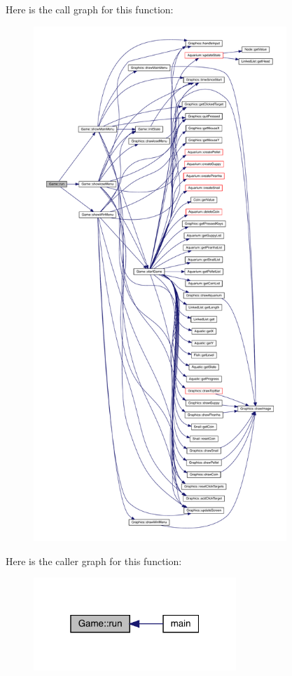 Here is the call graph for this function\+:\nopagebreak
\begin{figure}[H]
\begin{center}
\leavevmode
\includegraphics[height=550pt]{class_game_a1ab78f5ed0d5ea879157357cf2fb2afa_cgraph}
\end{center}
\end{figure}
Here is the caller graph for this function\+:
\nopagebreak
\begin{figure}[H]
\begin{center}
\leavevmode
\includegraphics[width=217pt]{class_game_a1ab78f5ed0d5ea879157357cf2fb2afa_icgraph}
\end{center}
\end{figure}
\mbox{\label{class_game_a1d537d2349fb33959018a02eccea1c79}} 
